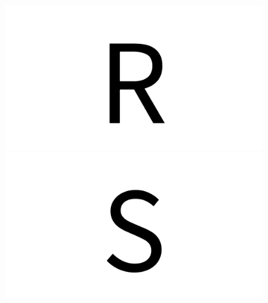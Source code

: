 \documentclass{article}
\begin{document}
\begin{figure}[H]
  \includegraphics[width=\linewidth]{u_R}
\endminipage\hfill
{}
  \includegraphics[width=\linewidth]{u_S}
\endminipage\hfill
\end{figure}
\end{document}
